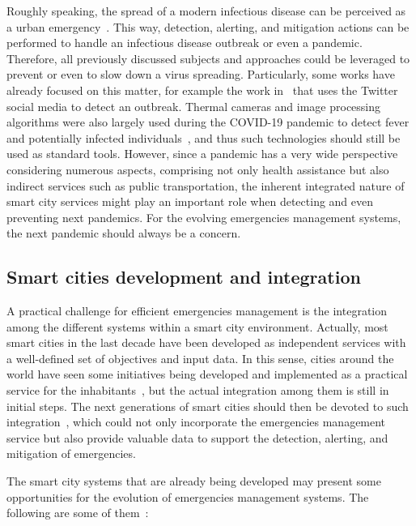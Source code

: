 \begin{refsection}
Roughly speaking, the spread of a modern infectious disease can be perceived as a urban emergency~\cite{covidsmartcities1}. This way, detection, alerting, and mitigation actions can be performed to handle an infectious disease outbreak or even a pandemic. Therefore, all previously discussed subjects and approaches could be leveraged to prevent or even to slow down a virus spreading. Particularly, some works have already focused on this matter, for example the work in~\cite{twitter2} that uses the Twitter social media to detect an outbreak. Thermal cameras and image processing algorithms were also largely used during the COVID-19 pandemic to detect fever and potentially infected individuals~\cite{covidsmartcities4}, and thus such technologies should still be used as standard tools. However, since a pandemic has a very wide perspective considering numerous aspects, comprising not only health assistance but also indirect services such as public transportation, the inherent integrated nature of smart city services might play an important role when detecting and even preventing next pandemics. For the evolving emergencies management systems, the next pandemic should always be a concern.

\subsection{Smart cities development and integration}

A practical challenge for efficient emergencies management is the integration among the different systems within a smart city environment. Actually, most smart cities in the last decade have been developed as independent services with a well-defined set of objectives and input data. In this sense, cities around the world have seen some initiatives being developed and implemented as a practical service for the inhabitants~\cite{citiestransforming,citiestransforming2}, but the actual integration among them is still in initial steps. The next generations of smart cities should then be devoted to such integration~\cite{smartcities3}, which could not only incorporate the emergencies management service but also provide valuable data to support the detection, alerting, and mitigation of emergencies.

The smart city systems that are already being developed may present some opportunities for the evolution of emergencies management systems. The following are some of them~\cite{citiestransforming}:


\end{refsection}
